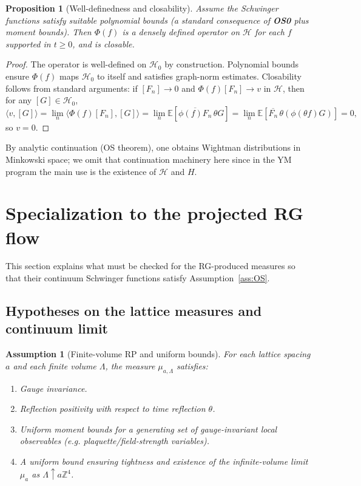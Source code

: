 \documentclass[11pt]{article}
\newtheorem{proposition}[theorem]{Proposition}
\newtheorem{assumption}[theorem]{Assumption}
\theoremstyle{definition}
\newcommand{\E}{\mathbb{E}}
\newcommand{\1}{\mathbf{1}}
\newcommand{\ip}[2]{\langle #1,#2\rangle}
\newcommand{\cH}{\mathcal{H}}
\newcommand{\Z}{\mathbb{Z}}
\begin{document}
\begin{proposition}[Well-definedness and closability]
Assume the Schwinger functions satisfy suitable polynomial bounds (a standard consequence of \textbf{OS0} plus moment bounds). Then \(\Phi(f)\) is a densely defined operator on \(\cH\) for each \(f\) supported in \(t\ge 0\), and is closable.
\end{proposition}

\begin{proof}
The operator is well-defined on \(\cH_0\) by construction. Polynomial bounds ensure \(\Phi(f)\) maps \(\cH_0\) to itself and satisfies graph-norm estimates. Closability follows from standard arguments: if \([F_n]\to 0\) and \(\Phi(f)[F_n]\to v\) in \(\cH\), then for any \([G]\in\cH_0\),
\[
\ip{v}{[G]} = \lim_n \ip{\Phi(f)[F_n]}{[G]} = \lim_n \E[\overline{\phi(f)F_n}\, \theta G]=\lim_n \E[\overline{F_n}\, \theta(\phi(\theta f)G)] =0,
\]
so \(v=0\).
\end{proof}

By analytic continuation (OS theorem), one obtains Wightman distributions in Minkowski space; we omit that continuation machinery here since in the YM program the main use is the existence of \(\cH\) and \(H\).

\section{Specialization to the projected RG flow}

This section explains what must be checked for the RG-produced measures so that their continuum Schwinger functions satisfy Assumption~\ref{ass:OS}.

\subsection{Hypotheses on the lattice measures and continuum limit}

\begin{assumption}[Finite-volume RP and uniform bounds]\label{ass:lattice}
For each lattice spacing \(a\) and each finite volume \(\Lambda\), the measure \(\mu_{a,\Lambda}\) satisfies:
\begin{enumerate}[label=(\alph*),leftmargin=2.6em]
\item Gauge invariance.
\item Reflection positivity with respect to time reflection \(\theta\).
\item Uniform moment bounds for a generating set of gauge-invariant local observables (e.g. plaquette/field-strength variables).
\item A uniform bound ensuring tightness and existence of the infinite-volume limit \(\mu_a\) as \(\Lambda\uparrow a\Z^4\).
\end{enumerate}
\end{assumption}
\end{document}
